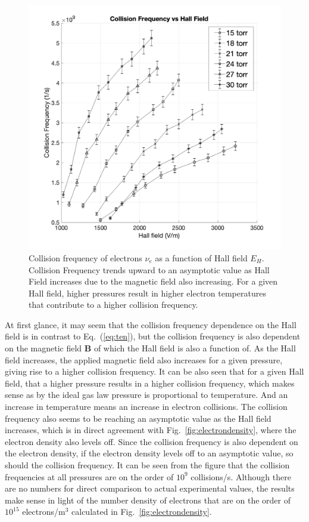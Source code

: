 \documentclass[%
 aip,
rsi,%
 amsmath,amssymb,
 reprint,%
author-numerical,%
]{revtex4-1}
\begin{document}
\begin{figure}
\includegraphics[width=1\linewidth]{lateximages/collisionfrequency.png} 
\caption{\label{fig:collisionfrequency}  Collision frequency of electrons $\nu _ { e }$ as a function of Hall field  ${E}  _ { H }$. Collision Frequency trends upward to an asymptotic value as Hall Field increases due to the magnetic field also increasing. For a given Hall field, higher pressures result in higher electron temperatures that contribute to a higher collision frequency.}
\end{figure}

At first glance, it may seem that the collision frequency dependence on the Hall field is in contrast to Eq.~(\ref{eq:ten}), but the collision frequency is also dependent on the magnetic field $\boldsymbol { B }$ of which the Hall field is also a function of. As the Hall field increases, the applied magnetic field also increases for a given pressure, giving rise to a higher collision frequency. It can be also seen that for a given Hall field, that a higher pressure results in a higher collision frequency, which makes sense as by the ideal gas law pressure is proportional to temperature. And an increase in temperature means an increase in electron collisions. The collision frequency also seems to be reaching an asymptotic value as the Hall field increases, which is in direct agreement with Fig.~\ref{fig:electrondensity}, where the electron density also levels off. Since the collision frequency is also dependent on the electron density, if the electron density levels off to an asymptotic value, so should the collision frequency. \newline
\indent It can be seen from the figure that the collision frequencies at all pressures are on the order of $10^9$ collisions/s. Although there are no numbers for direct comparison to actual experimental values, the results make sense in light of the number density of electrons that are on the order of $10^{15}$ electrons/m$^{3}$ calculated in Fig.~\ref{fig:electrondensity}.
\end{document}
